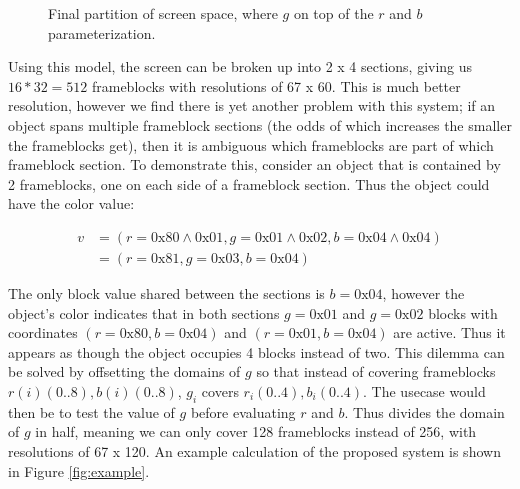 \documentclass[conference]{IEEEtran}
\begin{document}
\begin{figure}[h!]
\begin{center}
\begin{minipage}[t]{\linewidth}
\caption{Final partition of screen space, where $g$ on top of the $r$ and $b$ parameterization.}
\label{fig:partition}
\end{minipage}
\end{center}
\end{figure}

Using this model, the screen can be broken up into 2 x 4 sections, giving us $16 * 32 = 512$ frameblocks
with resolutions of 67 x 60.
This is much better resolution, however we find there is yet another problem with this
system; if an object spans multiple frameblock sections (the odds of which increases the smaller the frameblocks get),
then it is ambiguous which frameblocks are part of which frameblock section.
To demonstrate this, consider an object that is contained by 2 frameblocks, one on each side of a frameblock section.
Thus the object could have the color value:

\begin{align*}
v &= (r = \text{0x80} \wedge \text{0x01},g=\text{0x01} \wedge \text{0x02}, b=\text{0x04} \wedge \text{0x04})\\
  &= (r=\text{0x81},g=\text{0x03},b=\text{0x04})
\end{align*}

The only block value shared between the sections is $b = \text{0x04}$, however the object's color indicates that
in both sections $g = \text{0x01}$ and $g = \text{0x02}$ blocks with coordinates $(r=\text{0x80},b=\text{0x04})$ and
$(r=\text{0x01},b=\text{0x04})$ are active. Thus it appears as though the object occupies 4 blocks instead of two.
This dilemma can be solved by offsetting the domains of $g$ so that instead of covering frameblocks
$r(i)(0..8),b(i)(0..8)$,
$g_i$ covers $r_i(0..4),b_i(0..4)$.
The usecase would then be to test the value of $g$ before evaluating $r$ and $b$.
Thus divides the domain of $g$ in half, meaning we can only cover 128 frameblocks instead of 256,
with resolutions of 67 x 120.
An example calculation of the proposed system is shown in Figure \ref{fig:example}.
\end{document}
